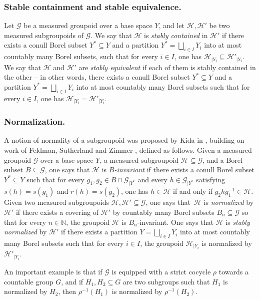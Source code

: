 \documentclass[11pt]{article}
\numberwithin{equation}{section}
\let\mathcal\mathscr
\theoremstyle{plain}
\theoremstyle{definition}
\let\Dunion\bigsqcup
\newcommand{\calg}{\mathcal{G}}
\newcommand{\calh}{\mathcal{H}}
\begin{document}
\subsubsection*{Stable containment and stable equivalence.} Let $\calg$ be a measured groupoid over a base space $Y$, and let $\calh,\calh'$ be two measured subgroupoids of $\calg$. We say that $\calh$ is \emph{stably contained} in $\calh'$ if there exists a conull Borel subset $Y^*\subseteq Y$ and a partition $Y^*=\Dunion_{i\in I}Y_i$ into at most countably many Borel subsets, such that for every $i\in I$, one has $\calh_{|Y_i}\subseteq\calh'_{|Y_i}$. We say that $\calh$ and $\calh'$ are \emph{stably equivalent} if each of them is stably contained in the other -- in other words, there exists a conull Borel subset $Y^*\subseteq Y$ and a partition $Y^*=\Dunion_{i\in I}Y_i$ into at most countably many Borel subsets such that for every $i\in I$, one has $\calh_{|Y_i}=\calh'_{|Y_i}$.

\subsubsection*{Normalization.}

A notion of normality of a subgroupoid was proposed by Kida in \cite[Chap.\,4, \S6.1]{Kid-memoir}, building on work of Feldman, Sutherland and Zimmer \cite{FSZ}, defined as follows. Given a measured groupoid $\calg$ over a base space $Y$, a measured subgroupoid $\calh\subseteq\calg$, and a Borel subset $B\subseteq\calg$, one says that $\calh$ is \emph{$B$-invariant} if there exists a conull Borel subset $Y^*\subseteq Y$ such that for every $g_1,g_2\in B\cap\calg_{|Y^*}$ and every $h\in\calg_{|Y^*}$ satisfying $s(h)=s(g_1)$ and $r(h)=s(g_2)$, one has $h\in\calh$ if and only if $g_2hg_1^{-1}\in\calh$. Given two measured subgroupoids $\calh,\calh'\subseteq\calg$, one says that~$\calh$ is \emph{normalized} by $\calh'$ if there exists a covering of $\calh'$ by countably many Borel subsets $B_n\subseteq\calg$ so that for every $n\in\mathbb{N}$, the groupoid $\calh$ is $B_n$-invariant. One says that $\calh$ is \emph{stably normalized} by $\calh'$ if there exists a partition $Y=\Dunion_{i\in I}Y_i$ into at most countably many Borel subsets such that for every $i\in I$, the groupoid $\calh_{|Y_i}$ is normalized by $\calh'_{|Y_i}$.

An important example is that if $\calg$ is equipped with a strict cocycle $\rho$ towards a countable group $G$, and if $H_1,H_2\subseteq G$ are two subgroups such that $H_1$ is normalized by $H_2$, then $\rho^{-1}(H_1)$ is normalized by $\rho^{-1}(H_2)$.
\end{document}
